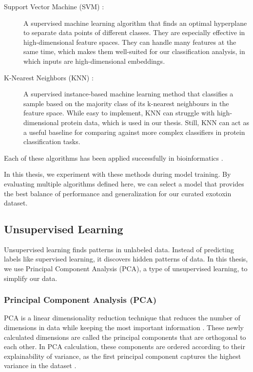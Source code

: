 {{\begin{description}
	
	\item[Support Vector Machine (SVM)  \cite{Cortes1995}:] A supervised machine learning algorithm that finds an optimal hyperplane to separate data points of different classes.
	They are especially effective in high-dimensional feature spaces.
	They can handle many features at the same time, which makes them well-suited for our classification analysis, in which inputs are high-dimensional embeddings. \cite{Alcaraz2022}
	
	
	\item[K-Nearest Neighbors (KNN)  \cite{Guo2003}:] A supervised instance-based machine learning method that classifies a sample based on the majority class of its k-nearest neighbours in the feature space.
	While easy to implement, KNN can struggle with high-dimensional protein data, which is used in our thesis.
	Still, KNN can act as a useful baseline for comparing against more complex classifiers in protein classification tasks.
	\end{description}
	
	
	
Each of these algorithms has been applied successfully in bioinformatics \cite{Larranaga2006} \cite{Chen2011}.
	
In this thesis, we experiment with these methods during model training.
By evaluating multiple algorithms defined here, we can select a model that provides the best balance of performance and generalization for our curated exotoxin dataset.

\subsection{Unsupervised Learning}

Unsupervised learning finds patterns in unlabeled data.
Instead of predicting labels like supervised learning, it discovers hidden patterns of data. In this thesis, we use Principal Component Analysis (PCA), a type of unsupervised learning, to simplify our data.

\subsubsection{Principal Component Analysis (PCA)}

\gls{PCA} is a linear dimensionality reduction technique that reduces the number of dimensions in data while keeping the most important information \cite{jolliffe2016principal, greenacre2022principal}.
These newly calculated dimensions are called the principal components that are orthogonal to each other.
In \gls{PCA} calculation, these components are ordered according to their explainability of variance, as the first principal component captures the highest variance in the dataset \cite{bishop2006pattern}.

}}
